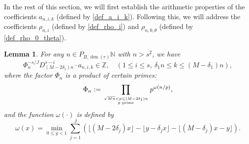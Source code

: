 \documentclass[12pt]{article}
\newtheorem{lemma}[theorem]{Lemma}
\numberwithin{equation}{section}
\begin{document}

\bigskip

In the rest of this section, we will first establish the arithmetic properties of the coefficients $a_{n,i,k}$ (defined by \eqref{def_a_i_k}). Following this, we will address the coefficients $\rho_{n,i}$ (defined by \eqref{def_rho_i}) and $\rho_{n,0,\theta}$ (defined by \eqref{def_rho_0_theta}).

\begin{lemma}\label{arith_a_i_k}
For any $n \in P_{B,\operatorname{den}(r)}\mathbb{N}$ with $n > s^2$, we have
\[ \Phi_n^{-s/J} D_{(M-2\delta_1)n}^{s-i} \cdot  a_{n,i,k} \in \mathbb{Z}, \quad (1 \leqslant i \leqslant s,~\delta_1 n \leqslant k \leqslant (M-\delta_1)n),   \]
where the factor $\Phi_n$ is a product of certain primes:
\begin{equation}\label{defi_Phi}
\Phi_n := \prod_{\sqrt{Mn} < p \leqslant (M-2\delta_1)n \atop p \text{~prime}} p^{\omega(n/p)}, 
\end{equation}
and the function $\omega(\cdot)$ is defined by
\begin{equation}\label{defi_omega}
\omega(x) = \min_{0 \leqslant y < 1} \sum_{j=1}^{J}  \left( \lfloor(M-2\delta_j)x\rfloor - \lfloor y-\delta_j x \rfloor - \lfloor (M-\delta_j)x - y \rfloor \right).
\end{equation}
\end{lemma}
\end{document}
